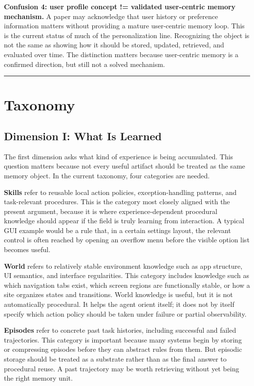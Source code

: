 \documentclass{article}
\begin{document}
\textbf{Confusion 4: user profile concept != validated user-centric
memory mechanism.} A paper may acknowledge that user history or
preference information matters without providing a mature user-centric
memory loop. This is the current status of much of the personalization
line. Recognizing the object is not the same as showing how it should be
stored, updated, retrieved, and evaluated over time. The distinction
matters because user-centric memory is a confirmed direction, but still
not a solved mechanism.

\begin{center}\rule{0.5\linewidth}{0.5pt}\end{center}

\section{Taxonomy}\label{4-taxonomy}

\subsection{Dimension I: What Is
Learned}\label{41-dimension-i-what-is-learned}

The first dimension asks what kind of experience is being accumulated.
This question matters because not every useful artifact should be
treated as the same memory object. In the current taxonomy, four
categories are needed.

\textbf{Skills} refer to reusable local action policies,
exception-handling patterns, and task-relevant procedures. This is the
category most closely aligned with the present argument, because it is
where experience-dependent procedural knowledge should appear if the
field is truly learning from interaction. A typical GUI example would be
a rule that, in a certain settings layout, the relevant control is often
reached by opening an overflow menu before the visible option list
becomes useful.

\textbf{World} refers to relatively stable environment knowledge such as
app structure, UI semantics, and interface regularities. This category
includes knowledge such as which navigation tabs exist, which screen
regions are functionally stable, or how a site organizes states and
transitions. World knowledge is useful, but it is not automatically
procedural. It helps the agent orient itself; it does not by itself
specify which action policy should be taken under failure or partial
observability.

\textbf{Episodes} refer to concrete past task histories, including
successful and failed trajectories. This category is important because
many systems begin by storing or compressing episodes before they can
abstract rules from them. But episodic storage should be treated as a
substrate rather than as the final answer to procedural reuse. A past
trajectory may be worth retrieving without yet being the right memory
unit.
\end{document}
